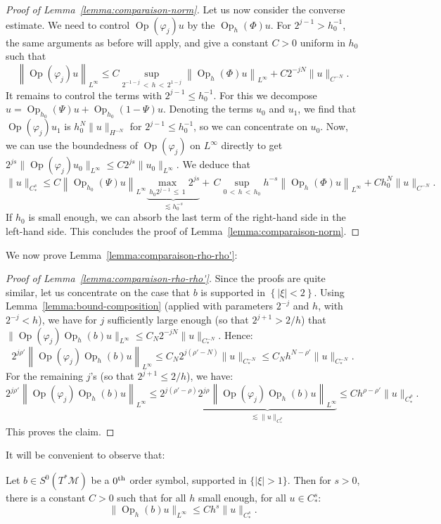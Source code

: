 \documentclass[AHL,Unicode,longabstracts,published]{cedram}
\newcommand{\M}{\mathcal{M}}
\DeclareMathOperator{\Op}{Op}
\begin{document}
\begin{proof}[Proof of Lemma~\ref{lemma:comparaison-norm}]
Let us now consider the converse estimate. We need to control $\Op(\varphi_j)u$ by the $\Op_h(\Phi)u$. For $2^{j-1} > h_0^{-1}$, the same arguments as before will apply, and give a constant $C>0$ uniform in $h_0$ such that
\[
\left\|\Op(\varphi_j)u\right\|_{L^\infty} \leq C \sup_{2^{-1-j}\,<\,h\,<\,2^{1-j}} \left\|\Op_h(\Phi)u\right\|_{L^\infty} + C 2^{-jN} \|u \|_{C^{-N}}.
\]
It remains to control the terms with $2^{j-1} \leq h_0^{-1}$. For this we decompose $u= \Op_{h_0}(\Psi)u + \Op_{h_0}(1-\Psi)u$. Denoting the terms $u_0$ and $u_1$, we find that $\Op(\varphi_j)u_1$ is $h_0^N\|u\|_{H^{-N}}$ for $2^{j-1}\leq h_0^{-1}$, so we can concentrate on $u_0$. Now, we can use the boundedness of $\Op(\varphi_j)$ on $L^\infty$ directly to get $2^{js} \| \Op(\varphi_j)u_0 \|_{L^\infty} \leq C 2^{js} \|u_0\|_{L^\infty}$. We deduce that
\[
\|u \|_{C^s_\ast} \leq C \left\|\Op_{h_0}(\Psi)u\right\|_{L^\infty} \underbrace{\max_{ h_0 2^{j-1}\,\leq\,1} 2^{js}}_{\lesssim h_0^{-s}} +\,C \sup_{0\,<\,h\,<\,h_0} h^{-s} \left\| \Op_h(\Phi) u\right\|_{L^\infty} + C h_0^N \|u \|_{C^{-N}}.
\]
If $h_0$ is small enough, we can absorb the last term of the right-hand side in the left-hand side. This concludes the proof of Lemma~\ref{lemma:comparaison-norm}.
\end{proof}

We now prove Lemma~\ref{lemma:comparaison-rho-rho'}:

\begin{proof}[Proof of Lemma~\ref{lemma:comparaison-rho-rho'}]
Since the proofs are quite similar, let us concentrate on the case that $b$ is supported in $\left\{|\xi|<2\right\}$. Using Lemma~\ref{lemma:bound-composition} (applied with parameters $2^{-j}$ and $h$, with $2^{-j} < h$), we have for $j$ sufficiently large enough (so that $2^{j+1} > 2/h$) that $\|\Op(\varphi_j)\Op_h(b)u\|_{L^\infty} \leq C_N 2^{-jN}\|u\|_{C^{-N}_*}$. Hence:
\[
2^{j \rho'} \left\|\Op(\varphi_j) \Op_h(b) u \right\|_{L^\infty} \leq C_N 2^{j(\rho'-N)} \|u\|_{C^{-N}_*} \leq C_N h^{N-\rho'} \|u\|_{C^{-N}_*}.
\]
For the remaining $j$'s (so that $2^{j+1} \leq 2/h$), we have:
\[
2^{j \rho'} \left\|\Op(\varphi_j) \Op_h(b) u \right\|_{L^\infty} \leq 2^{j(\rho'-\rho)} \underbrace{2^{j\rho} \left\|\Op(\varphi_j) \Op_h(b) u \right\|_{L^\infty}}_{\lesssim \|u\|_{C^\rho_*}} \leq C h^{\rho-\rho'} \|u\|_{C^\rho_*}.
\]
This proves the claim.
\end{proof}


It will be convenient to observe that:

\begin{lemm}\label{lemma:control-by-Cs}
Let $b \in S^0(T^*\M)$ be a $0^{\rm th}$ order symbol, supported in $\{|\xi|>1\}$. Then for $s>0$, there is a constant $C>0$ such that for all $h$ small enough, for all $u\in C^s_\ast$:
\[
\| \Op_h(b) u \|_{L^\infty} \leq C h^s \| u \|_{C^s_\ast}.
\]
\end{lemm}
\end{document}
